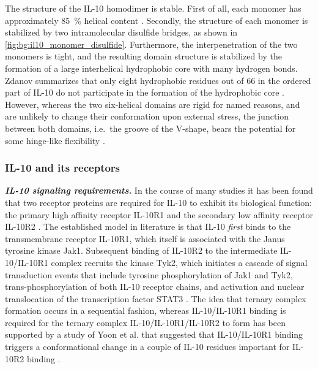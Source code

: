 The structure of the IL-10 homodimer is stable. First of all, each monomer has
approximately \SI{85}{\percent} helical content \cite{Zdanov1995}. Secondly, the
structure of each monomer is stabilized by two intramolecular disulfide bridges,
as shown in \cref{fig:bg:il10_monomer_disulfide}. Furthermore, the
interpenetration of the two monomers is tight, and the resulting domain
structure is stabilized by the formation of a large interhelical hydrophobic
core with many hydrogen bonds. Zdanov summarizes that only eight hydrophobic
residues out of 66 in the ordered part of IL-10 do not participate in the
formation of the hydrophobic core \cite{Zdanov1995}. However, whereas the two
six-helical domains are rigid for named reasons, and are unlikely to change
their conformation upon external stress, the junction between both domains,
i.e.\ the groove of the V-shape, bears the potential for some hinge-like
flexibility \cite{Zdanov1995}.


\subsubsection{IL-10 and its receptors}


\vspace{0.5cm}
\textit{\textbf{IL-10 signaling requirements.}}
In the course of many studies it has been found that two receptor proteins are
required for IL-10 to exhibit its biological function: the primary high affinity
receptor IL-10R1 and the secondary low affinity receptor IL-10R2
\cite{mosser_il10_newperspectives_2008}. The established model in literature is
that IL-10 \textit{first} binds to the transmembrane receptor IL-10R1, which
itself is associated with the Janus tyrosine kinase Jak1. Subsequent binding of
IL-10R2 to the intermediate IL-10/IL-10R1 complex recruits the kinase Tyk2,
which initiates a cascade of signal transduction events that include tyrosine
phosphorylation of Jak1 and Tyk2, trans-phosphorylation of both IL-10 receptor
chains, and activation and nuclear translocation of the transcription factor
STAT3
\cite{donnelly_finbloom_il10_1999}. The idea that ternary complex formation
occurs in a sequential fashion, whereas IL-10/IL-10R1 binding is required for
the ternary complex IL-10/IL-10R1/IL-10R2 to form has been supported by a study
of Yoon et al. that suggested that IL-10/IL-10R1 binding triggers a
conformational change in a couple of IL-10 residues important for IL-10R2
binding \cite{il10r2_conf_changes_2006}.

